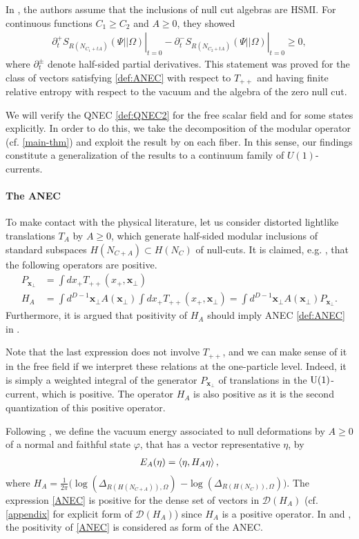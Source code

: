 \documentclass[12pt]{article}
\def\D{{\mathcal D}}
\def\uone{{\rm U(1)}}
\def\tx{\pmb{x}}
\theoremstyle{remark}
\begin{document}
In \cite{CF18}, the authors assume that the inclusions of null cut algebras are HSMI. For continuous functions $C_1\geq C_2$ and $A\geq 0$,
they showed
\begin{align}\label{def:QNEC3}
	\left.\partial_t^+ S_{R(N_{C_1+tA})}(\Psi||\Omega)\right|_{t=0}-\left.\partial_t^- S_{R(N_{C_2+tA})}(\Psi||\Omega)\right|_{t=0}\geq 0,
\end{align}
where $\partial_t^\pm$ denote half-sided partial derivatives.
This statement was proved for the class of vectors satisfying \eqref{def:ANEC} with respect to $T_{++}$ and having finite relative entropy with respect to the vacuum and the algebra of the zero null cut.


We will verify the QNEC \eqref{def:QNEC2} for the free scalar field and for some states explicitly.
In order to do this, we take the decomposition of the modular operator (cf. \autoref{main-thm}) and exploit the result by \cite{LongoLocalised} on each fiber.
In this sense, our findings constitute a generalization of the results to a continuum family of  $U(1)$-currents.

\paragraph{The ANEC}

To make contact with the physical literature,
let us consider distorted lightlike translations $T_A$ by $A\geq 0$, which generate half-sided modular inclusions of standard subspaces $H(N_{C+A})\subset H(N_C)$ of null-cuts.
It is claimed, e.g.\! \cite[(5.6) and (5.18)]{CTT17}, that the following operators are positive.
\begin{align*}
	P_{\tx_\perp}&=\int dx_+ T_{++}(x_+,\tx_\perp) \\
	H_A&=\int d^{D-1}\tx_\perp A(\tx_\perp)\int dx_+ T_{++}(x_+,\tx_\perp) = \int d^{D-1}\tx_\perp A(\tx_\perp)P_{\tx_\perp}.
\end{align*} 
Furthermore, it is argued that positivity of $H_A$ should imply ANEC \eqref{def:ANEC} in \cite[Section 3.2]{FLPW16}.

Note that the last expression does not involve $T_{++}$, and we can make sense of it in the free field if we interpret these relations at the one-particle level.
Indeed, it is simply a weighted integral of the generator $P_{\tx_\perp}$ of translations in the $\uone$-current,
which is positive. The operator $H_A$ is also positive as it is the second quantization of this positive operator.

Following \cite{LongoLocalised}, we define the vacuum energy associated to null deformations by $A \geq 0$ of a normal and faithful state $\varphi$,
that has a vector representative $\eta$, by
\begin{align}
	E_A(\eta)=\braket{\eta,H_{A}\eta}\label{ANEC},
\end{align}
where $H_A=\frac{1}{2\pi}\big(\log(\Delta_{R(H(N_{C+A})),\Omega})$ $-\log(\Delta_{R(H(N_C)),\Omega})\big)$.
The expression \eqref{ANEC} is positive for the dense set of vectors in $\D(H_A)$ (cf. \autoref{appendix} for explicit form of $\D(H_A)$) since $H_A$ is a positive operator. In \cite{LongoLocalised} and \cite{CF18}, the positivity of \eqref{ANEC} is considered as form of the ANEC.
\end{document}
